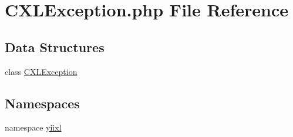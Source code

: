 \hypertarget{CXLException_8php}{
\section{CXLException.php File Reference}
\label{CXLException_8php}
}
\subsection*{Data Structures}
\begin{DoxyCompactItemize}
\item 
class \hyperlink{classCXLException}{CXLException}
\end{DoxyCompactItemize}
\subsection*{Namespaces}
\begin{DoxyCompactItemize}
\item 
namespace \hyperlink{namespaceyiixl}{yiixl}
\end{DoxyCompactItemize}
